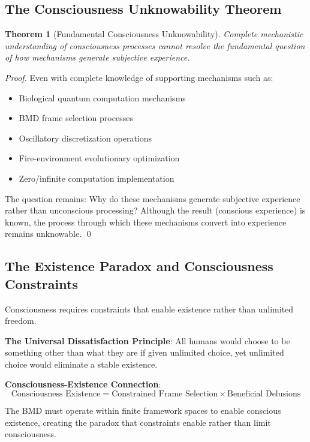 \documentclass[12pt,a4paper]{article}
\newtheorem{theorem}{Theorem}
\begin{document}
\subsection{The Consciousness Unknowability Theorem}

\begin{theorem}[Fundamental Consciousness Unknowability]
Complete mechanistic understanding of consciousness processes cannot resolve the fundamental question of how mechanisms generate subjective experience.
\end{theorem}

\begin{proof}
  Even with complete knowledge of supporting mechanisms such as:
  \begin{itemize}
    \item Biological quantum computation mechanisms
    \item BMD frame selection processes
    \item Oscillatory discretization operations
    \item Fire-environment evolutionary optimization
    \item Zero/infinite computation implementation
  \end{itemize}
  The question remains: Why do these mechanisms generate subjective experience rather than unconscious processing? Although the result (conscious experience) is known, the process through which these mechanisms convert into experience remains unknowable.
  \hfill \qed
\end{proof}


\subsection{The Existence Paradox and Consciousness Constraints}

Consciousness requires constraints that enable existence rather than unlimited freedom.

\textbf{The Universal Dissatisfaction Principle}: All humans would choose to be something other than what they are if given unlimited choice, yet unlimited choice would eliminate a stable existence.

\textbf{Consciousness-Existence Connection}:
$$\text{Consciousness Existence} = \text{Constrained Frame Selection} \times \text{Beneficial Delusions}$$

The BMD must operate within finite framework spaces to enable conscious existence, creating the paradox that constraints enable rather than limit consciousness.
\end{document}
